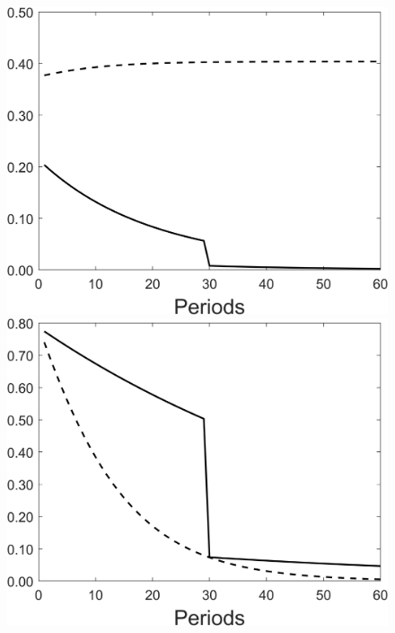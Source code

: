 \begin{figure}[h!!]
\begin{minipage}[]{0.32\textwidth}
	\end{minipage}
	\begin{minipage}[]{0.32\textwidth}
		\includegraphics[width=1\textwidth]{../codding_model/Own/figures/Rep_agent/staticRam_LF_separate_hl_periods59_eppsilon0.40_zeta1.40_Ad08_Ac04_thetac0.70_thetad0.56_HetGrowth1_tauul0.181_util0_withtarget1_lgd0.png}
	\end{minipage}
	\begin{minipage}[]{0.32\textwidth}
		\includegraphics[width=1\textwidth]{../codding_model/Own/figures/Rep_agent/staticRam_LF_separate_yc_periods59_eppsilon0.40_zeta1.40_Ad08_Ac04_thetac0.70_thetad0.56_HetGrowth1_tauul0.181_util0_withtarget1_lgd0.png}

\end{minipage}
\end{figure}
